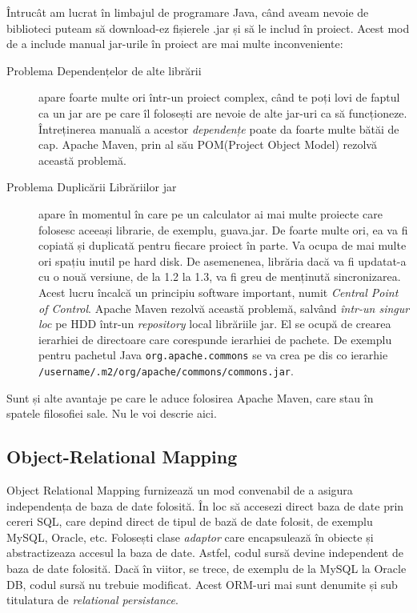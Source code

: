 
Întrucât am lucrat în limbajul de programare Java, când aveam nevoie de biblioteci puteam să download-ez fișierele .jar și să le includ în proiect. Acest mod de a include manual jar-urile în proiect are mai multe inconveniente:


\begin{description}
\item[Problema Dependențelor de alte librării] apare foarte multe ori într-un proiect complex, când te poți lovi de faptul ca un jar are pe care îl folosești are nevoie de alte jar-uri ca să funcționeze. Întreținerea manuală a acestor \textit{dependențe} poate da foarte multe bătăi de cap. Apache Maven, prin al său POM(Project Object Model) rezolvă această problemă.

\item[Problema Duplicării Librăriilor jar] apare în momentul în care pe un calculator ai mai multe proiecte care folosesc aceeași librarie, de exemplu, guava.jar. De foarte multe ori, ea va fi copiată și duplicată pentru fiecare proiect în parte. Va ocupa de mai multe ori spațiu inutil pe hard disk. De asemenenea, librăria dacă va fi updatat-a cu o nouă versiune, de la 1.2 la 1.3, va fi greu de menținută sincronizarea. Acest lucru încalcă un principiu software important, numit \textit{Central Point of Control}. Apache Maven rezolvă această problemă, salvând \textit{într-un singur loc} pe HDD într-un \textit{repository} local librăriile jar. El se ocupă de crearea ierarhiei de directoare care corespunde ierarhiei de pachete. De exemplu pentru pachetul Java \texttt{org.apache.commons} se va crea pe dis co ierarhie \texttt{/username/.m2/org/apache/commons/commons.jar}.
\end{description}

Sunt și alte avantaje pe care le aduce folosirea Apache Maven, care stau în spatele filosofiei sale. Nu le voi descrie aici.

\subsection{Object-Relational Mapping}



Object Relational Mapping furnizează un mod convenabil de a asigura independența de baza de date folosită. În loc să accesezi direct baza de date prin cereri SQL, care depind direct de tipul de bază de date folosit, de exemplu MySQL, Oracle, etc. Folosești clase \textit{adaptor} care encapsulează în obiecte și abstractizeaza accesul la baza de date. Astfel, codul sursă devine independent de baza de date folosită. Dacă în viitor, se trece, de exemplu de la MySQL la Oracle DB, codul sursă nu trebuie modificat. Acest ORM-uri mai sunt denumite și sub titulatura de \textit{relational persistance}.

